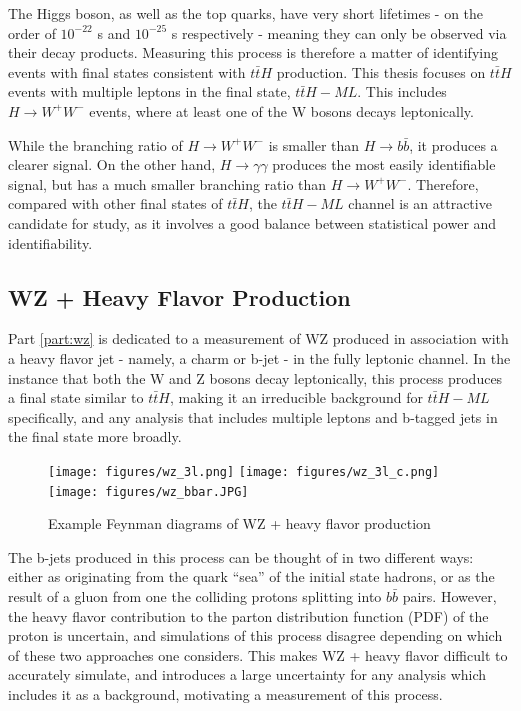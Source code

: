 The Higgs boson, as well as the top quarks, have very short lifetimes - on the order of $10^{-22}$ s and $10^{-25}$ s respectively - meaning they can only be observed via their decay products. Measuring this process is therefore a matter of identifying events with final states consistent with $t\bar{t}H$ production. This thesis focuses on $t\bar{t}H$ events with multiple leptons in the final state, $t\bar{t}H-ML$. This includes $H \rightarrow W^+W^-$ events, where at least one of the W bosons decays leptonically. 

While the branching ratio of $H\rightarrow W^+W^-$ is smaller than $H \rightarrow b \bar{b}$, it produces a clearer signal. On the other hand, $H\rightarrow \gamma\gamma$ produces the most easily identifiable signal, but has a much smaller branching ratio than $H\rightarrow W^+W^-$. Therefore, compared with other final states of $t\bar{t}H$, the $t\bar{t}H-ML$ channel is an attractive candidate for study, as it involves a good balance between statistical power and identifiability. 


\subsection{WZ + Heavy Flavor Production}
\label{sec:WZ_theory}

Part \ref{part:wz} is dedicated to a measurement of WZ produced in association with a heavy flavor jet - namely, a charm or b-jet - in the fully leptonic channel. In the instance that both the W and Z bosons decay leptonically, this process produces a final state similar to $t\bar{t}H$, making it an irreducible background for $t\bar{t}H-ML$ specifically, and any analysis that includes multiple leptons and b-tagged jets in the final state more broadly. 

\begin{figure}[H]
  \texttt{[image: figures/wz\_3l.png]}%
  \texttt{[image: figures/wz\_3l\_c.png]}%
  \texttt{[image: figures/wz\_bbar.JPG]}
  \caption{Example Feynman diagrams of WZ + heavy flavor production}
  \label{fig:wz_feynman}
\end{figure}

The b-jets produced in this process can be thought of in two different ways: either as originating from the quark ``sea'' of the initial state hadrons, or as the result of a gluon from one the colliding protons splitting into $b\bar{b}$ pairs. However, the heavy flavor contribution to the parton distribution function (PDF) of the proton is uncertain, and simulations of this process disagree depending on which of these two approaches one considers. This makes WZ + heavy flavor difficult to accurately simulate, and introduces a large uncertainty for any analysis which includes it as a background, motivating a measurement of this process.

